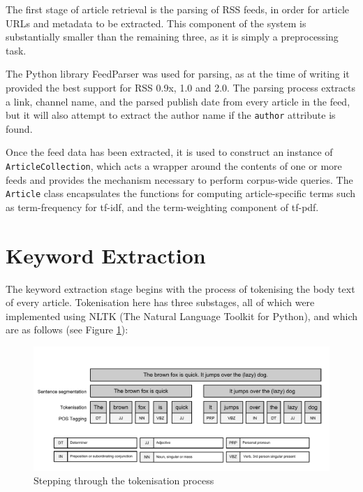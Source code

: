 The first stage of article retrieval is the parsing of RSS feeds, in order for article URLs and metadata to be extracted. This component of the system is substantially smaller than the remaining three, as it is simply a preprocessing task.

The Python library FeedParser was used for parsing, as at the time of writing it provided the best support for RSS 0.9x, 1.0 and 2.0. The parsing process extracts a link, channel name, and the parsed publish date from every article in the feed, but it will also attempt to extract the author name if the \texttt{author} attribute is found.

Once the feed data has been extracted, it is used to construct an instance of \texttt{ArticleCollection}, which acts a wrapper around the contents of one or more feeds and provides the mechanism necessary to perform corpus-wide queries. The \texttt{Article} class encapsulates the functions for computing article-specific terms such as term-frequency for tf-idf, and the term-weighting component of tf-pdf. 


\section{Keyword Extraction} \label{sec:keys}

The keyword extraction stage begins with the process of tokenising the body text of every article. Tokenisation here has three substages, all of which were implemented using NLTK (The Natural Language Toolkit for Python), and which are as follows (see Figure \ref{fig:tokenisation}):

\begin{figure}[htbp!]
	\centering
	\includegraphics[width=\textwidth]{img/implementation/Tokenisation.pdf}
	\caption{Stepping through the tokenisation process}
	\label{fig:tokenisation}
\end{figure}

